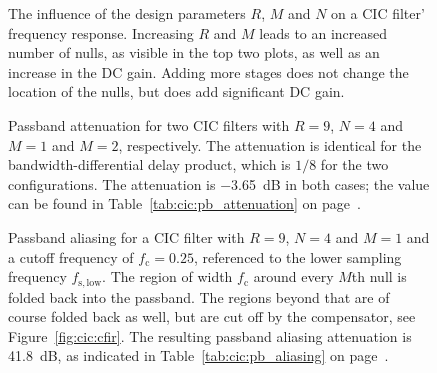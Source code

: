 \begin{figure}
    \centering
        
        \caption[Influence of Design Parameters on Frequency Response]{%
            The influence of  the design parameters $R$, $M$ and  $N$ on a CIC
            filter' frequency  response.  Increasing $R$  and $M$ leads  to an
            increased number  of nulls, as  visible in  the top two  plots, as
            well as an  increase in the DC gain.  Adding  more stages does not
            change  the location  of the  nulls, but  does add  significant DC
            gain.%
        }
        \label{fig:cic:freq_responses:var}
\end{figure}

\begin{figure}
    \centering
        
        \caption[CIC Filter: Passband and Aliasing Attenuation]{%
            Passband   attenuation   for   two   CIC   filters   with   $R=9$,
            $N=4$   and  $M=1$   and   $M=2$,  respectively. The   attenuation
            is  identical   for  the  bandwidth-differential   delay  product,
            which    is   $1/8$    for    the    two   configurations.     The
            attenuation   is  \SI{-3.65}{\dB}   in  both   cases;  the   value
            can    be   found    in   Table~\ref{tab:cic:pb_attenuation}    on
            page~\pageref{tab:cic:pb_attenuation}.%
        }
        \label{fig:cic:freq_responses:passband:attenuation}
\end{figure}

\begin{figure}
    \centering
        
        \caption[CIC Filter: Passband and Aliasing Attenuation]{%
            Passband  aliasing  for   a  CIC  filter  with  $R   =  9$,  $N=4$
            and  $M=1$  and  a  cutoff frequency  of  $f_\mathrm{c}  =  0.25$,
            referenced  to the  lower  sampling frequency  $f_\mathrm{s,low}$.
            The  region  of  width  $f_\mathrm{c}$  around  every  $M$th  null
            is   folded   back   into   the   passband. The   regions   beyond
            that   are  of   course  folded   back  as   well,  but   are  cut
            off  by  the   compensator,  see  Figure~\ref{fig:cic:cfir}.   The
            resulting   passband  aliasing   attenuation  is   \SI{41.8}{\dB},
            as     indicated     in     Table~\ref{tab:cic:pb_aliasing}     on
            page~\pageref{tab:cic:pb_aliasing}.%
        }
        \label{fig:cic:freq_responses:passband:aliasing}
\end{figure}
%
%
